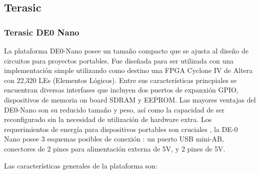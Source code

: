 				\subsection{Terasic}
				\subsubsection{Terasic DE0 Nano}
				La plataforma DE0-Nano posee un tamaño compacto que se ajusta al diseño de circuitos para proyectos portables. Fue diseñada para ser
				utilizada con una implementación simple utilizando como destino una FPGA Cyclone IV de Altera con 22,320 LEs (Elementos Lógicos). Entre sus
				características princpiales se encuentran diversas interfases que incluyen dos puertos de expanxión GPIO, dispositivos de memoria on board SDRAM y
				EEPROM. Las mayores ventajas del DE0-Nano son su reducido tamaño y peso, así como la capacidad de ser reconfigurado sin la necesidad de
				utilización de hardware extra. Los requerimientos de energía para dispositivos portables son cruciales , la DE-0 Nano posee 3 esquemas posibles
				de conexión : un puerto USB mini-AB, conectores de 2 pines para alimentación externa de 5V, y 2 pines de 5V.

				Las características generales de la plataforma son:
				
